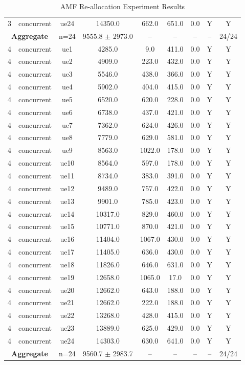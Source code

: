 \begin{table}[ht]
\begin{tabular}{|c|c|c|c|c|c|c|c|c|}
3 & concurrent & ue24 & 14350.0 & 662.0 & 651.0 & 0.0 & Y & Y \\
\multicolumn{2}{|c|}{\textbf{Aggregate}} & n=24 & 9555.8 $\pm$ 2973.0 & -- & -- & -- & -- & 24/24 \\
\hline
4 & concurrent & ue1 & 4285.0 & 9.0 & 411.0 & 0.0 & Y & Y \\
4 & concurrent & ue2 & 4909.0 & 223.0 & 432.0 & 0.0 & Y & Y \\
4 & concurrent & ue3 & 5546.0 & 438.0 & 366.0 & 0.0 & Y & Y \\
4 & concurrent & ue4 & 5902.0 & 404.0 & 415.0 & 0.0 & Y & Y \\
4 & concurrent & ue5 & 6520.0 & 620.0 & 228.0 & 0.0 & Y & Y \\
4 & concurrent & ue6 & 6738.0 & 437.0 & 421.0 & 0.0 & Y & Y \\
4 & concurrent & ue7 & 7362.0 & 624.0 & 426.0 & 0.0 & Y & Y \\
4 & concurrent & ue8 & 7779.0 & 629.0 & 581.0 & 0.0 & Y & Y \\
4 & concurrent & ue9 & 8563.0 & 1022.0 & 178.0 & 0.0 & Y & Y \\
4 & concurrent & ue10 & 8564.0 & 597.0 & 178.0 & 0.0 & Y & Y \\
4 & concurrent & ue11 & 8734.0 & 383.0 & 391.0 & 0.0 & Y & Y \\
4 & concurrent & ue12 & 9489.0 & 757.0 & 422.0 & 0.0 & Y & Y \\
4 & concurrent & ue13 & 9901.0 & 785.0 & 423.0 & 0.0 & Y & Y \\
4 & concurrent & ue14 & 10317.0 & 829.0 & 460.0 & 0.0 & Y & Y \\
4 & concurrent & ue15 & 10771.0 & 870.0 & 421.0 & 0.0 & Y & Y \\
4 & concurrent & ue16 & 11404.0 & 1067.0 & 430.0 & 0.0 & Y & Y \\
4 & concurrent & ue17 & 11405.0 & 636.0 & 430.0 & 0.0 & Y & Y \\
4 & concurrent & ue18 & 11826.0 & 646.0 & 631.0 & 0.0 & Y & Y \\
4 & concurrent & ue19 & 12658.0 & 1065.0 & 17.0 & 0.0 & Y & Y \\
4 & concurrent & ue20 & 12662.0 & 643.0 & 188.0 & 0.0 & Y & Y \\
4 & concurrent & ue21 & 12662.0 & 222.0 & 188.0 & 0.0 & Y & Y \\
4 & concurrent & ue22 & 13268.0 & 428.0 & 415.0 & 0.0 & Y & Y \\
4 & concurrent & ue23 & 13889.0 & 625.0 & 429.0 & 0.0 & Y & Y \\
4 & concurrent & ue24 & 14303.0 & 630.0 & 641.0 & 0.0 & Y & Y \\
\multicolumn{2}{|c|}{\textbf{Aggregate}} & n=24 & 9560.7 $\pm$ 2983.7 & -- & -- & -- & -- & 24/24 \\
\hline
\end{tabular}
\caption{AMF Re-allocation Experiment Results}
\label{tab:amf_realloc}
\end{table}
